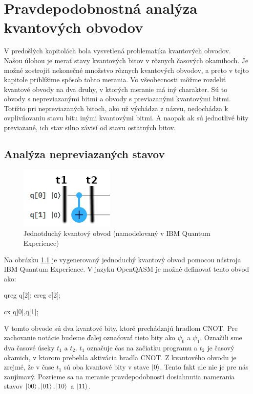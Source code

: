 
\chapter{Pravdepodobnostná analýza kvantových obvodov}
\label{pravAnalL}

V predošlých kapitolách bola vysvetlená problematika kvantových obvodov.
Našou úlohou je merať stavy kvantových bitov v rôznych časových okamihoch.
Je možné zostrojiť nekonečné množstvo rôznych kvantových obvodov,
a preto v tejto kapitole priblížime spôsob tohto merania.
Vo všeobecnosti môžme rozdeliť kvantové obvody na dva druhy, v ktorých 
meranie má iný charakter. Sú to obvody s nepreviazanými bitmi a obvody s 
previazanými kvantovými bitmi. Totižto pri nepreviazaných bitoch,
ako už výchádza z názvu, nedochádza k ovplivňovaniu stavu bitu inými 
kvantovými bitmi. A naopak ak sú jednotlivé bity previazané, ich stav silno
závisí od stavu ostatných bitov.

\section{Analýza nepreviazaných stavov}

\begin{figure} 
	\centering 
	\includegraphics[width=.4\textwidth]{figures/simpleCircuit2.png} 
	\caption{Jednotduchý kvantový obvod (namodelovaný v IBM Quantum Experience)}
    \label{obvod}
\end{figure}

Na obrázku \ref{obvod} je vygenerovaný jednoduchý kvantový obvod pomocou
nástroja IBM Quantum Experience. V jazyku OpenQASM je možné definovať tento
obvod ako:
\begin{code}
qreg q[2];
creg c[2];

cx q[0],q[1];
\end{code}

V tomto obvode sú dva kvantové bity, ktoré prechádzajú 
hradlom CNOT. Pre zachovanie notácie budeme ďalej označovať tieto bity ako 
\(\psi_0\) a \(\psi_1\). Označili sme dva časové úseky \(t_1\) a \(t_2\).
\(t_1\) označuje čas na začiatku programu a \(t_2\) je časový okamich, v ktorom
prebehla aktivácia hradla CNOT.
 Z kvantového obvodu je zrejmé, že v čase \(t_1\) 
sú oba kvantové bity v stave
\(\ket{0}\). Tento fakt ale nie je pre nás zaujímavý. Pozrieme sa na meranie 
pravdepodobnosti dosiahnutia  
namerania stavov \(\ket{00}, \ket{01}, \ket{10}\) a \(\ket{11}\).

